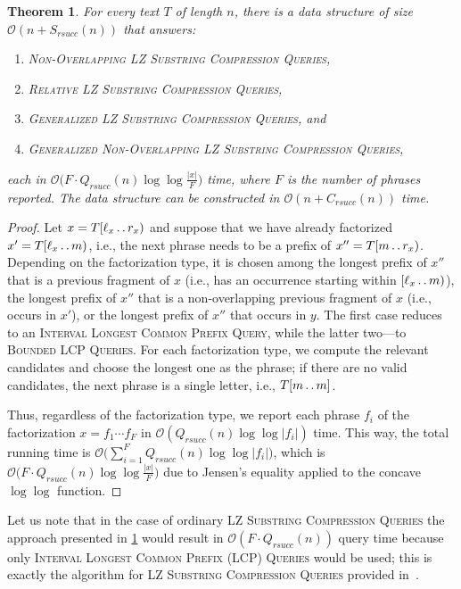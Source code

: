 \documentclass[a4paper]{article}
\newtheorem{theorem}{Theorem}[section]
\theoremstyle{definition}
\theoremstyle{remark}
\newcommand{\BLCP}{\textsc{Bounded LCP Queries}\xspace}
\newcommand{\ILCP}{\textsc{Interval Longest Common Prefix (LCP) Queries}\xspace}
\newcommand{\LSC}{\textsc{LZ Substring Compression Queries}\xspace}
\newcommand{\GSC}{\textsc{Generalized LZ Substring Compression Queries}\xspace}
\newcommand{\dd}{\mathinner{\ldotp\ldotp}}
\newcommand{\maybeqed}{}
\newcommand{\Oh}{\mathcal{O}}
\newcommand{\rsucc}{\mathit{rsucc}}
\begin{document}
\begin{theorem}\label{thm:lsc}
For every text $T$ of length $n$, there is a data structure of size $\Oh(n+S_{\rsucc}(n))$
that answers:
\begin{enumerate}[label=(\alph*)]
  \item \textsc{Non-Overlapping} \LSC,
  \item \textsc{Relative} \LSC,
  \item \GSC, and
    \item \textsc{Generalized Non-Overlapping} \LSC,
\end{enumerate}
each in $\Oh\bigl(F\cdot Q_{\rsucc}(n)\log\log\frac{|x|}{F}\bigr)$ time,
where $F$ is the number of phrases reported.
The data structure can be constructed in $\Oh(n+C_{\rsucc}(n))$ time.
\end{theorem}
\begin{proof}
Let $x=T[\ell_x\dd r_x)$ and suppose that we have already factorized $x'=T[\ell_x\dd m)$,
i.e., the next phrase needs to be a prefix of $x''=T[m\dd r_x)$.
Depending on the factorization type, it is chosen among the longest prefix of $x''$ that is a previous fragment of $x$ (i.e., has an occurrence starting within $[\ell_x\dd m)$), the longest prefix of $x''$ that is a non-overlapping previous fragment of $x$ (i.e., occurs in $x'$),
or the longest prefix of $x''$ that occurs in $y$.
The first case reduces to an \textsc{Interval Longest Common Prefix Query}, while the latter two---to \BLCP.
For each factorization type, we compute the relevant candidates and choose the longest one as the phrase;
if there are no valid candidates, the next phrase is a single letter, i.e., $T[m\dd m]$.

Thus, regardless of the factorization type, we report each phrase $f_i$ of the factorization $x=f_1\cdots f_F$
in $\Oh(Q_{\rsucc}(n) \log \log |f_i|)$ time. 
This way, the total running time is $\Oh\big(\sum_{i=1}^F Q_{\rsucc}(n)\log\log |f_i|\big)$, which is $\Oh\bigl(F\cdot Q_{\rsucc}(n)\log\log\frac{|x|}{F}\bigr)$  due to Jensen's equality applied to the concave $\log \log $ function.
\maybeqed \end{proof}

Let us note that in the case of ordinary \LSC the approach presented in \cref{thm:lsc} would result in $\Oh(F\cdot Q_{\rsucc}(n))$ query time
because only \ILCP would be used; this is exactly the algorithm for \LSC provided in~\cite{DBLP:journals/tcs/KellerKFL14}.
\end{document}
